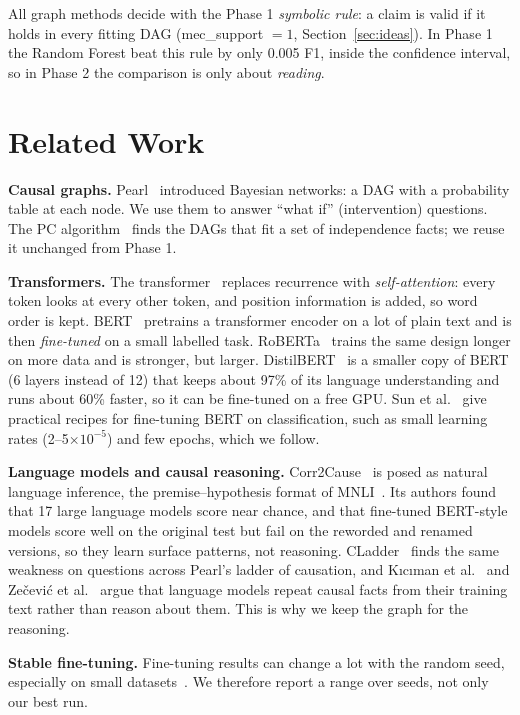 \documentclass[conference]{IEEEtran}
\begin{document}
All graph methods decide with the Phase 1 \emph{symbolic rule}: a claim is valid if it holds in every fitting DAG
(mec\_support $=1$, Section~\ref{sec:ideas}). In Phase 1 the Random Forest beat this rule by only 0.005 F1, inside
the confidence interval, so in Phase 2 the comparison is only about \emph{reading}.

\section{Related Work}
\textbf{Causal graphs.} Pearl~\cite{pearl1988} introduced Bayesian networks: a DAG with a probability table at
each node. We use them to answer ``what if'' (intervention) questions. The PC algorithm~\cite{spirtes2000} finds the
DAGs that fit a set of independence facts; we reuse it unchanged from Phase 1.

\textbf{Transformers.} The transformer~\cite{vaswani2017} replaces recurrence with \emph{self-attention}: every token
looks at every other token, and position information is added, so word order is kept. BERT~\cite{devlin2019}
pretrains a transformer encoder on a lot of plain text and is then \emph{fine-tuned} on a small labelled task.
RoBERTa~\cite{liu2019} trains the same design longer on more data and is stronger, but larger.
DistilBERT~\cite{sanh2019} is a smaller copy of BERT (6 layers instead of 12) that keeps about 97\% of its language
understanding and runs about 60\% faster, so it can be fine-tuned on a free GPU. Sun et al.~\cite{sun2019} give
practical recipes for fine-tuning BERT on classification, such as small learning rates (2--5$\times10^{-5}$) and few
epochs, which we follow.

\textbf{Language models and causal reasoning.} Corr2Cause~\cite{jin2024} is posed as natural language inference,
the premise--hypothesis format of MNLI~\cite{williams2018}. Its authors found that 17 large language models score
near chance, and that fine-tuned BERT-style models score well on the original test but fail on the reworded and
renamed versions, so they learn surface patterns, not reasoning. CLadder~\cite{jin2023cladder} finds the same
weakness on questions across Pearl's ladder of causation, and K\i c\i man et al.~\cite{kiciman2023} and
Ze\v{c}evi\'c et al.~\cite{zecevic2023} argue that language models repeat causal facts from their training text
rather than reason about them. This is why we keep the graph for the reasoning.

\textbf{Stable fine-tuning.} Fine-tuning results can change a lot with the random seed, especially on small
datasets~\cite{dodge2020,mosbach2021}. We therefore report a range over seeds, not only our best run.
\end{document}
